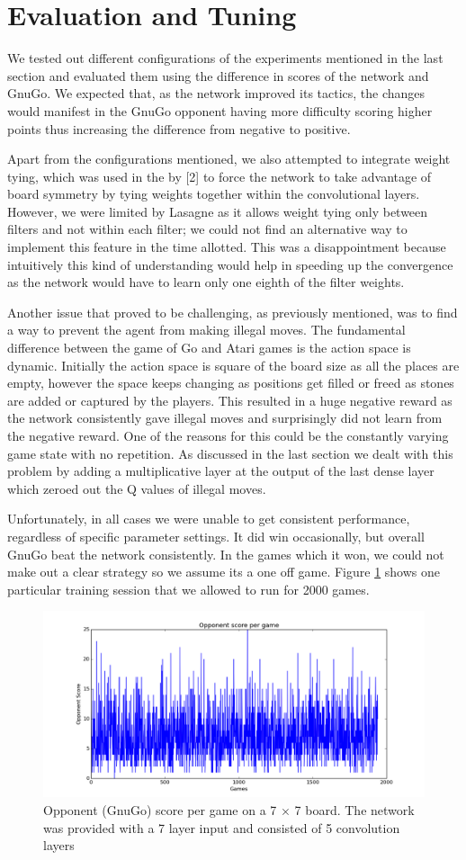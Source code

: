 \section{Evaluation and Tuning}

We tested out different configurations of the experiments mentioned in the last section and evaluated them using the difference in scores of the network and GnuGo. We expected that, as the network improved its tactics, the changes would manifest in the GnuGo opponent having more difficulty scoring higher points thus increasing the difference from negative to positive.

Apart from the configurations mentioned, we also attempted to integrate weight tying, which was used in the by [2] to force the network to take advantage of board symmetry by tying weights together within the convolutional layers. However, we were limited by Lasagne as it allows weight tying only between filters and not within each filter; we could not find an alternative way to implement this feature in the time allotted. This was a disappointment because intuitively this kind of understanding would help in speeding up the convergence as the network would have to learn only one eighth of the filter weights. 

Another issue that proved to be challenging, as previously mentioned, was to find a way to prevent the agent from making illegal moves. The fundamental difference between the game of Go and Atari games is the action space is dynamic. Initially the action space is square of the board size as all the places are empty, however the space keeps changing as positions get filled or freed as stones are added or captured by the players. This resulted in a huge negative reward as the network consistently gave illegal moves and surprisingly did not learn from the negative reward. One of the reasons for this could be the constantly varying game state with no repetition. As discussed in the last section we dealt with this problem by adding a multiplicative layer at the output of the last dense layer which zeroed out the Q values of illegal moves.  

Unfortunately, in all cases we were unable to get consistent performance, regardless of specific parameter settings. It did win occasionally, but overall GnuGo beat the network consistently. In the games which it won, we could not make out a clear strategy so we assume its a one off game. Figure \ref{fig:score} shows one particular training session that we allowed to run for 2000 games. 

\begin{figure}[h!]
\centering
\includegraphics[scale=0.5]{training_score.png}
\caption{Opponent (GnuGo) score per game on a 7 $\times$ 7 board. The network was provided with a 7 layer input and consisted of 5 convolution layers}
\label{fig:score}
\end{figure}
